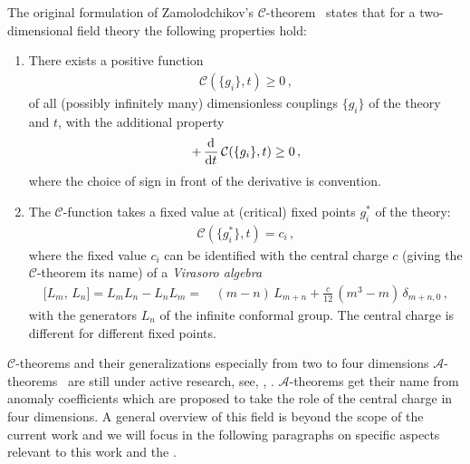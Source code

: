 The original formulation of Zamolodchikov's $\mathcal{C}$-theorem~\cite{Zamolodchikov:1986gt} states that for a two-dimensional field theory the following properties hold:
\begin{enumerate}
	\item There exists a positive function 
		\begin{align}
			\mathcal{C} ( \{ g_i \}, t ) \geq 0 \, ,	\label{eq:c-function_1}
		\end{align}
	of all (possibly infinitely many) dimensionless couplings $\{ g_i \}$ of the theory and \rgtime{} $t$, with the additional property
		\begin{align}
			+\dod{}{t} \mathcal{C} ( \{ g_i \}, t ) \geq 0 \, ,	\label{eq:c-function_2}
		\end{align}
	where the choice of sign in front of the derivative is convention.
	
	\item The $\mathcal{C}$-function takes a fixed value at (critical) fixed points $g_i^\ast$ of the theory:
		\begin{align}
			\mathcal{C} ( \{ g_i^\ast \}, t ) = c_i \, ,	\label{eq:c-function_3}
		\end{align}
	where the fixed value $c_i$ can be identified with the central charge $c$ (giving  the $\mathcal{C}$-theorem its name) of a \textit{Virasoro algebra}~\cite{Virasoro:1969zu}
		\begin{align}
			\big[ L_m, \, L_n \big] = L_m L_n - L_n L_m = \,& ( m - n ) \, L_{m + n} + \frac{c}{12} \, ( m^3 - m ) \, \delta_{m + n, 0} \, ,	\label{eq:c-function_virasoro}
		\end{align}
	with the generators $L_n$ of the infinite conformal group.
	The central charge is different for different fixed points.
\end{enumerate}
$\mathcal{C}$-theorems and their generalizations especially from two to four dimensions $\mathcal{A}$-theorems~\cite{Cardy:1988cwa} are still under active research, see, \eg{}, .
$\mathcal{A}$-theorems get their name from anomaly coefficients which are proposed to take the role of the central charge in four dimensions.
A general overview of this field is beyond the scope of the current work and we will focus in the following paragraphs on specific aspects relevant to this work and the \frg{}.

